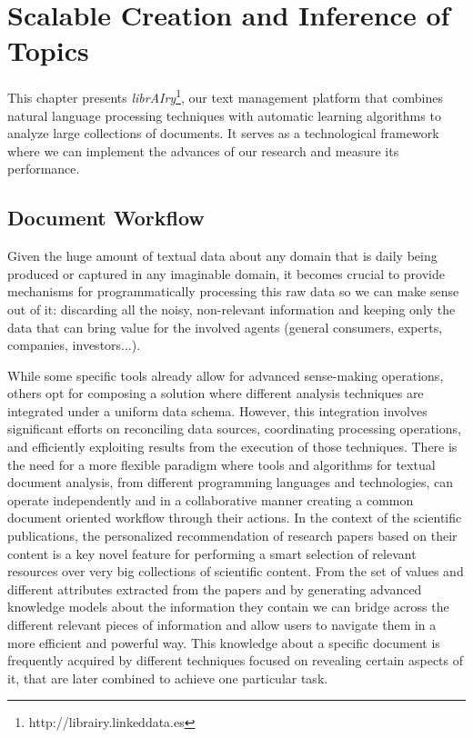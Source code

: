 

\chapter{Scalable Creation and Inference of Topics}\label{ch:scalability}

\graphicspath{{scalability/figures/}}


This chapter presents \textit{librAIry}\footnote{http://librairy.linkeddata.es}, our text management platform that combines natural language processing techniques with automatic learning algorithms to analyze large collections of documents.  It serves as a technological framework where we can implement the advances of our research and measure its performance. 

\section{Document Workflow}

Given the huge amount of textual data about any domain that is daily being produced or captured in any imaginable domain, it becomes crucial to provide mechanisms for programmatically processing this raw data so we can make sense out of it: discarding all the noisy, non-relevant information and keeping only the data that can bring value for the involved agents (general consumers, experts, companies, investors...). 

While some specific tools already allow for advanced sense-making operations, others opt for composing a solution where different analysis techniques are integrated under a uniform data schema. However, this integration involves significant efforts on reconciling data sources, coordinating processing operations, and efficiently exploiting results from the execution of those techniques. There is the need for a more flexible paradigm where tools and algorithms for textual document analysis, from different programming languages and technologies, can operate independently and in a collaborative manner creating a common document oriented workflow through their actions. 
In the context of the scientific publications, the personalized recommendation of research papers based on their content is a key novel feature for performing a smart selection of relevant resources over very big collections of scientific content. From the set of values and different attributes extracted from the papers and by generating advanced knowledge models about the information they contain we can bridge across the different relevant pieces of information and allow users to navigate them in a more efficient and powerful way. This knowledge about a specific document is frequently acquired by different techniques focused on revealing certain aspects of it, that are later combined to achieve one particular task. 

